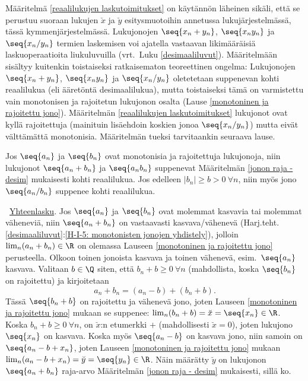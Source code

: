 Määritelmä \ref{reaalilukujen laskutoimitukset} on käytännön läheinen sikäli, että se
perustuu suoraan lukujen $\breve{x}$ ja $\breve{y}$ esitysmuotoihin annetussa
lukujärjestelmässä, tässä kymmenjärjestelmässä. Lukujonojen $\seq{x_n+y_n}$, $\seq{x_ny_n}$ ja
$\seq{x_n/y_n}$ termien laskemisen voi ajatella vastaavan likimääräisiä laskuoperaatioita
liukuluvuilla (vrt.\ Luku \ref{desimaaliluvut}). Määritelmään sisältyy kuitenkin toistaiseksi
ratkaisematon teoreettinen ongelma: Lukujonojen $\seq{x_n+y_n}$, $\seq{x_ny_n}$ ja
$\seq{x_n/y_n}$ oletetetaan suppenevan kohti reaalilukua (eli ääretöntä desimaalilukua), mutta
toistaiseksi tämä on varmistettu vain monotonisen ja rajoitetun lukujonon osalta
(Lause \ref{monotoninen ja rajoitettu jono}). Määritelmän
\ref{reaalilukujen laskutoimitukset} lukujonot ovat kyllä rajoitettuja (mainituin lisäehdoin
koskien jonoa $\seq{x_n/y_n}$) mutta eivät välttämättä monotonisia. Määritelmän tueksi
tarvitaankin seuraava lause.
\begin{Lause} \label{monotoninen ja rajoitettu jono - yleistys} Jos $\seq{a_n}$ ja $\seq{b_n}$
ovat monotonisia ja rajoitettuja lukujonoja, niin lukujonot $\seq{a_n+b_n}$ ja $\seq{a_nb_n}$
suppenevat Määritelmän \ref{jonon raja - desim} mukaisesti kohti reaalilukua. Jos edelleen
$|b_n| \ge b>0\ \forall n$, niin myös jono $\seq{a_n/b_n}$ suppenee kohti reaalilukua.
\end{Lause}
\tod \ \underline{Yhteenlasku}. Jos $\seq{a_n}$ ja $\seq{b_n}$ ovat molemmat kasvavia tai
molemmat väheneviä, niin $\seq{a_n+b_n}$ on vastaavasti kasvava/vähenevä
(Harj.teht.\,\ref{desimaaliluvut}:\ref{H-I-5: monotonisten jonojen yhdistely}), jolloin
$\lim_n(a_n+b_n)\in\R$ on olemassa Lauseen \ref{monotoninen ja rajoitettu jono} perusteella.
Olkoon toinen jonoista kasvava ja toinen vähenevä, esim.\ $\seq{a_n}$ kasvava. Valitaan
$b\in\Q$ siten, että $b_n+b \ge 0\ \forall n$ (mahdollista, koska $\seq{b_n}$ on rajoitettu) ja
kirjoitetaan
\[
a_n+b_n = (a_n-b)+(b_n+b).
\]
Tässä $\seq{b_n+b}$ on rajoitettu ja vähenevä jono, joten Lauseen
\ref{monotoninen ja rajoitettu jono} mukaan se suppenee:
$\lim_n(b_n+b)=\breve{x}=\seq{x_n}\in\R$. Koska $b_n+b \ge 0\ \forall n$, on $\breve{x}$:n
etumerkki $+$ (mahdollisesti $\breve{x}=0$), joten lukujono $\seq{x_n}$ on kasvava.
Koska myös $\seq{a_n-b}$ on kasvava jono, niin samoin on $\seq{a_n-b+x_n}$, joten
Lauseen \ref{monotoninen ja rajoitettu jono} mukaan 
$\lim_n(a_n-b+x_n)=\breve{y}=\seq{y_n}\in\R$. Näin määrätty $\breve{y}$ on lukujonon
$\seq{a_n+b_n}$ raja-arvo Määritelmän \ref{jonon raja - desim} mukaisesti, sillä ko.\
